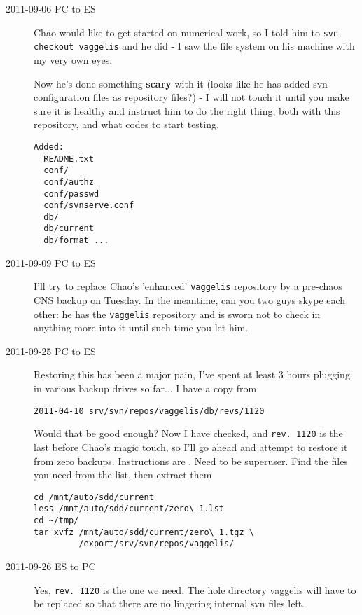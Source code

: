 \begin{description}
\item[2011-09-06 PC to ES]
Chao would like to get started on numerical work, so I told him to
    \texttt{svn checkout vaggelis}
and he did - I saw the file system on his machine with my very own eyes.

Now he's done something \textbf{scary} with it (looks like he has added svn configuration
files as repository files?) - I will not touch it until you make sure it is healthy and
instruct him to do the right thing, both with this repository, and what codes to start
testing.

\begin{verbatim}
Added:
  README.txt
  conf/
  conf/authz
  conf/passwd
  conf/svnserve.conf
  db/
  db/current
  db/format ...
\end{verbatim}

\item[2011-09-09 PC to ES]
I'll try to replace Chao's 'enhanced' \texttt{vaggelis} repository by a
pre-chaos CNS backup on Tuesday. In the meantime, can you two guys skype
each other: he has the \texttt{vaggelis} repository and is sworn not to
check in anything more into it until such time you let him.

\item[2011-09-25 PC to ES]
Restoring this has been a major pain, I've spent at least 3 hours
plugging in various backup drives so far... I have a copy from
\begin{verbatim}
2011-04-10 srv/svn/repos/vaggelis/db/revs/1120
\end{verbatim}
Would that be good enough?
Now I have checked, and \texttt{rev. 1120} is the last before Chao's 
magic touch,
so I'll go ahead and attempt to restore it from zero backups. Instructions
are . 
Need to be superuser.
Find
the files you need from the list, then extract them
\begin{verbatim}
cd /mnt/auto/sdd/current
less /mnt/auto/sdd/current/zero\_1.lst
cd ~/tmp/
tar xvfz /mnt/auto/sdd/current/zero\_1.tgz \
         /export/srv/svn/repos/vaggelis/
\end{verbatim}

\item[2011-09-26 ES to PC]

Yes, \texttt{rev. 1120} is the one we need. The hole directory vaggelis will have
to be replaced so that there are no lingering internal svn files left.

\end{description}

